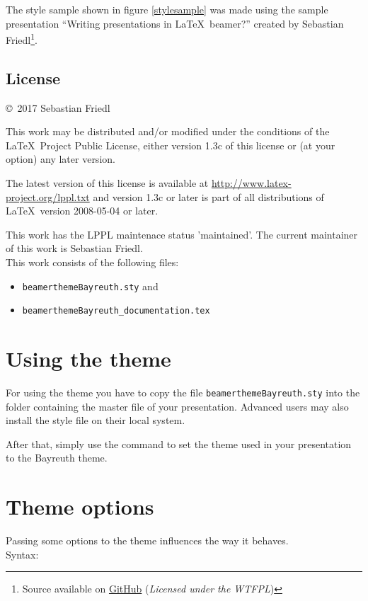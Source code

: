 \documentclass[11pt]{ltxdoc}
\begin{document}
	The style sample shown in figure \ref{stylesample} was made using the sample presentation \enquote{Writing presentations in \LaTeX\ beamer?} created by Sebastian Friedl\footnote{Source available on \href{https://github.com/SFr682k/sample-latex-beamer-presentation}{GitHub} (\textit{Licensed under the WTFPL})}.
	
	
	\subsection*{License}
	\begin{small}
		\copyright\ 2017 Sebastian Friedl
		
		\smallskip
		This work may be distributed and/or modified under the conditions of the \LaTeX\ Project Public License, either version 1.3c of this license or (at your option) any later version.
		
		\smallskip
		The latest version of this license is available at \url{http://www.latex-project.org/lppl.txt} and version 1.3c or later is part of all distributions of \LaTeX\ version 2008-05-04 or later.
	
		\smallskip
		This work has the LPPL maintenace status 'maintained'. The current maintainer of this work is Sebastian Friedl. \\
		This work consists of the following files:
		\begin{itemize} \itemsep 0pt
			\item \texttt{beamerthemeBayreuth.sty} and
			\item \texttt{beamerthemeBayreuth\_documentation.tex}
		\end{itemize}
	\end{small}
	
	
	
	
	\section{Using the theme}
	For using the theme you have to copy the file \texttt{beamerthemeBayreuth.sty} into the folder containing the master file of your presentation. Advanced users may also install the style file on their local system. \par
	After that, simply use the command \texttt{} to set the theme used in your presentation to the Bayreuth theme.

	
	\section{Theme options}				\label{themeoptions}
	Passing some options to the theme influences the way it behaves. \\
	Syntax: \ \ \texttt{}
	
\end{document}
